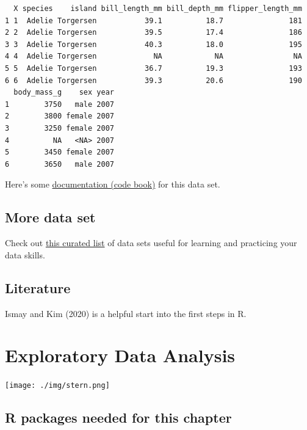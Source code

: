 \documentclass[
  letterpaper,
  DIV=11,
  numbers=noendperiod]{scrreprt}
\theoremstyle{definition}
\theoremstyle{definition}
\theoremstyle{remark}
\begin{document}
\begin{verbatim}
  X species    island bill_length_mm bill_depth_mm flipper_length_mm
1 1  Adelie Torgersen           39.1          18.7               181
2 2  Adelie Torgersen           39.5          17.4               186
3 3  Adelie Torgersen           40.3          18.0               195
4 4  Adelie Torgersen             NA            NA                NA
5 5  Adelie Torgersen           36.7          19.3               193
6 6  Adelie Torgersen           39.3          20.6               190
  body_mass_g    sex year
1        3750   male 2007
2        3800 female 2007
3        3250 female 2007
4          NA   <NA> 2007
5        3450 female 2007
6        3650   male 2007
\end{verbatim}

Here's some
\href{https://vincentarelbundock.github.io/Rdatasets/doc/palmerpenguins/penguins.html}{documentation
(code book)} for this data set.

\hypertarget{more-data-set}{%
\section{More data set}\label{more-data-set}}

Check out
\href{https://data-se.netlify.app/2022/02/23/data-sets-for-for-teaching/}{this
curated list} of data sets useful for learning and practicing your data
skills.

\hypertarget{literature}{%
\section{Literature}\label{literature}}

Ismay and Kim (2020) is a helpful start into the first steps in R.


\hypertarget{exploratory-data-analysis}{%
\chapter{Exploratory Data Analysis}\label{exploratory-data-analysis}}

\texttt{[image: ./img/stern.png]}

\hypertarget{r-packages-needed-for-this-chapter}{%
\section{R packages needed for this
chapter}\label{r-packages-needed-for-this-chapter}}
\end{document}
